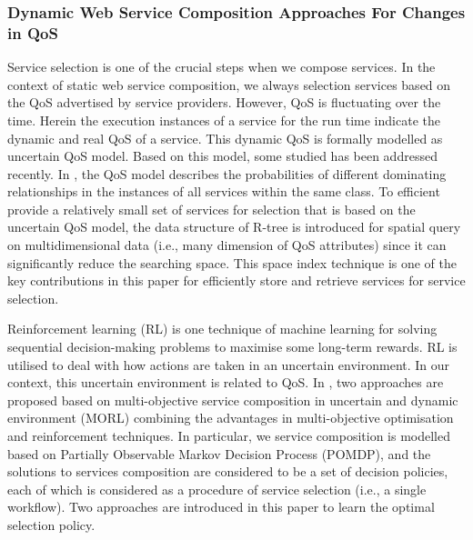 \subsubsection{Dynamic Web Service Composition Approaches For Changes in QoS}\label{dynamicQoS}

Service selection is one of the crucial steps when we compose services. In the context of static web service composition, we always selection services based on the QoS advertised by service providers. However, QoS is fluctuating over the time. Herein the execution instances of a service for the run time indicate the dynamic and real QoS of a service. This dynamic QoS is formally modelled as uncertain QoS model.  Based on this model, some studied \cite{wen2014probabilistic} has been addressed recently. In \cite{wen2014probabilistic}, the QoS model describes the probabilities of different dominating relationships in the instances of all services within the same class. To efficient provide a relatively small set of services for selection that is based on the uncertain QoS model, the data structure of R-tree is introduced for spatial query on multidimensional data (i.e., many dimension of QoS attributes) since it can significantly reduce the searching space. This space index technique is one of the key contributions in this paper for efficiently store and retrieve services for service selection. 

Reinforcement learning (RL) is one technique of machine learning for solving sequential decision-making problems to maximise some long-term rewards.  RL is utilised to deal with how actions are taken in an uncertain environment. In our context, this uncertain environment is related to QoS. In \cite{mostafa2015multi}, two approaches are proposed based on multi-objective service composition in uncertain and dynamic environment (MORL) combining the advantages in multi-objective optimisation and reinforcement techniques. In particular, we service composition is modelled based on Partially Observable Markov Decision Process (POMDP), and the solutions to services composition are considered to be a set of decision policies, each of which is considered as a procedure of service selection (i.e., a single workflow). Two approaches are introduced in this paper to learn the optimal selection policy. 

